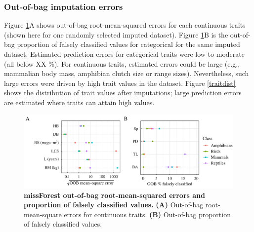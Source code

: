 \subsubsection{Out-of-bag imputation errors}
Figure \ref{OOBerrors}A shows out-of-bag root-mean-squared errors for each continuous traits (shown here for one randomly selected imputed dataset). Figure \ref{OOBerrors}B is the out-of-bag proportion of falsely classified values for categorical for the same imputed dataset.
Estimated prediction errors for categorical traits were low to moderate (all below XX \%). For continuous traits, estimated errors could be large (e.g., mammalian body mass, amphibian clutch size  or range sizes). Nevertheless, such large errors were driven by high trait values in the dataset. Figure \ref{traitdist} shows the distribution of trait values after imputations; large prediction errors are estimated where traits can attain high values. 
 
\begin{figure}[h!]
\centering
\includegraphics[scale=0.75]{figures/chapter2/Imputation_errors/MSE_PFC}
\caption[missForest out-of-bag root-mean-square errors and proportion of falsely classified values]{\textbf{missForest out-of-bag root-mean-squared errors and proportion of falsely classified values.} \textbf{(A)} Out-of-bag root-mean-square errors for continuous traits. \textbf{(B)} Out-of-bag proportion of falsely classified values.}
\label{OOBerrors}
\end{figure}


